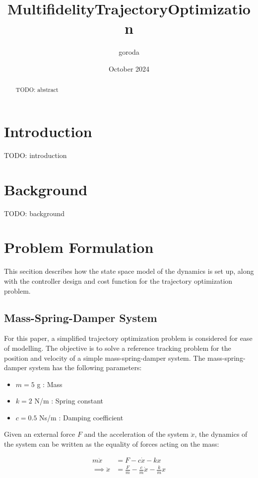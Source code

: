 \documentclass{article}
\title{MultifidelityTrajectoryOptimization}
\author{goroda }
\date{October 2024}
\begin{document}
\maketitle

\begin{abstract}
  TODO: abstract
\end{abstract}

\section{Introduction}
TODO: introduction
\section{Background}
TODO: background

\section{Problem Formulation}
This secition describes how the state space model of the dynamics is set up, along with the controller design and cost function for the trajectory optimization problem.
\subsection{Mass-Spring-Damper System}
For this paper, a simplified trajectory optimization problem is considered for ease of modelling.
The objective is to solve a reference tracking problem for the position and velocity of a simple mass-spring-damper system.
The mass-spring-damper system has the following parameters:

\begin{itemize}
  \item $m = 5$ g : Mass
  \item $k = 2$ N/m : Spring constant
  \item $c = 0.5$ Ns/m : Damping coefficient
\end{itemize}

Given an external force $F$ and the acceleration of the system $\ddot{x}$,
the dynamics of the system can be written as the equality of forces acting on the mass:

$$
\begin{aligned}
  m\ddot{x} &= F - c\dot{x} - kx \\
  \implies \ddot{x} &= \frac{F}{m} - \frac{c}{m}\dot{x} - \frac{k}{m}x
\end{aligned}
$$
\end{document}
